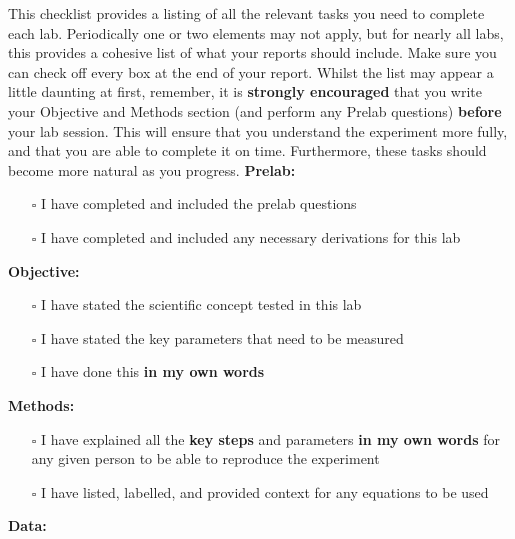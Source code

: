 This checklist provides a listing of all the relevant tasks you need to complete each lab. Periodically one or two elements may not apply, but for nearly all labs, this provides a cohesive list of what your reports should include. Make sure you can check off every box at the end of your report. Whilst the list may appear a little daunting at first, remember, it is \textbf{strongly encouraged} that you write your Objective and Methods section (and perform any Prelab questions) \textbf{before} your lab session. This will ensure that you understand the experiment more fully, and that you are able to complete it on time. Furthermore, these tasks should become more natural as you progress.
\newline
\newline
\textbf{Prelab:}
\begin{itemize}
    \item[$\square$] I have completed and included the prelab questions
    \item[$\square$] I have completed and included any necessary derivations for this lab
\end{itemize}    
\textbf{Objective:}
\begin{itemize}
    \item[$\square$] I have stated the scientific concept tested in this lab
    \item[$\square$] I have stated the key parameters that need to be measured
    \item[$\square$] I have done this \textbf{in my own words}
\end{itemize}
\textbf{Methods:}
\begin{itemize}
    \item[$\square$] I have explained all the \textbf{key steps} and parameters \textbf{in my own words} for any given person to be able to reproduce the experiment
    \item[$\square$] I have listed, labelled, and provided context for any equations to be used
\end{itemize}  
\textbf{Data:}
